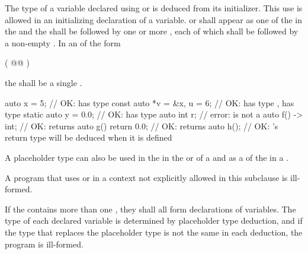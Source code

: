 \pnum
The type of a variable declared using  or  is
deduced from its initializer.
This use is allowed
in an initializing declaration of a variable.
 or  shall appear as one of the
 in the
 and the
shall be followed by one or more
,
each of which shall
be followed by a non-empty
.
In an  of the form

\begin{codeblock}
( @\textrm{}@ )
\end{codeblock}

the  shall be a single
.
\begin{example}
\begin{codeblock}
auto x = 5;                     // OK:  has type 
const auto *v = &x, u = 6;      // OK:  has type ,  has type 
static auto y = 0.0;            // OK:  has type 
auto int r;                     // error:  is not a 
auto f() -> int;                // OK:  returns 
auto g() { return 0.0; }        // OK:  returns 
auto h();                       // OK: 's return type will be deduced when it is defined
\end{codeblock}
\end{example}

\pnum
A placeholder type can also be used
in the  in
the  or  of a
and as a 
of the 
in a .

\pnum
A program that uses  or  in a context not
explicitly allowed in this subclause is ill-formed.

\pnum
If the  contains more than one
, they shall all form declarations of
variables. The type of each declared variable is determined
by placeholder type deduction,
and if the type that replaces the placeholder type is not the
same in each deduction, the program is ill-formed.

